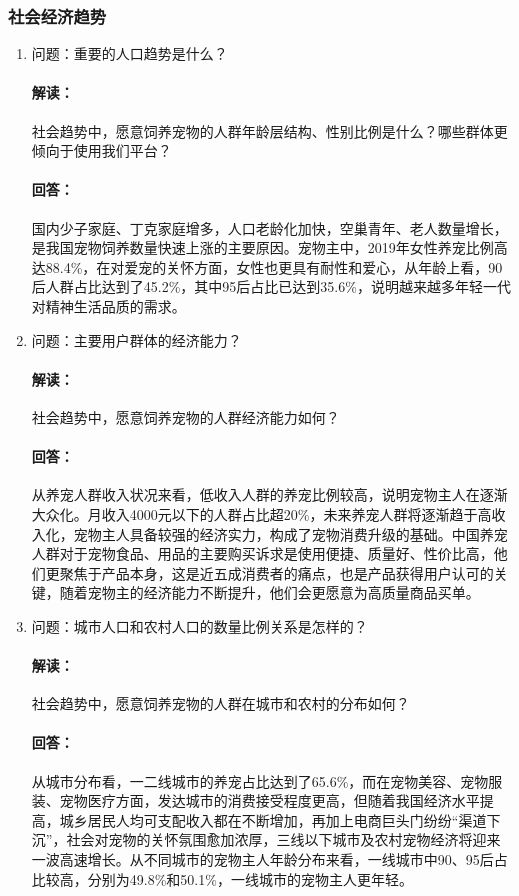 \documentclass[a4paper]{ctexart}
\begin{document}
\subsubsection{社会经济趋势}
\begin{enumerate}[label=\alph*.]
  \item 问题：重要的人口趋势是什么？
  \paragraph{解读：}社会趋势中，愿意饲养宠物的人群年龄层结构、性别比例是什么？哪些群体更倾向于使用我们平台？
  \paragraph{回答：}国内少子家庭、丁克家庭增多，人口老龄化加快，空巢青年、老人数量增长，是我国宠物饲养数量快速上涨的主要原因。宠物主中，2019年女性养宠比例高达88.4\%，在对爱宠的关怀方面，女性也更具有耐性和爱心，从年龄上看，90后人群占比达到了45.2\%，其中95后占比已达到35.6\%，说明越来越多年轻一代对精神生活品质的需求。
  \item 问题：主要用户群体的经济能力？
  \paragraph{解读：}社会趋势中，愿意饲养宠物的人群经济能力如何？
  \paragraph{回答：}从养宠人群收入状况来看，低收入人群的养宠比例较高，说明宠物主人在逐渐大众化。月收入4000元以下的人群占比超20\%，未来养宠人群将逐渐趋于高收入化，宠物主人具备较强的经济实力，构成了宠物消费升级的基础。中国养宠人群对于宠物食品、用品的主要购买诉求是使用便捷、质量好、性价比高，他们更聚焦于产品本身，这是近五成消费者的痛点，也是产品获得用户认可的关键，随着宠物主的经济能力不断提升，他们会更愿意为高质量商品买单。
  \item 问题：城市人口和农村人口的数量比例关系是怎样的？
  \paragraph{解读：}社会趋势中，愿意饲养宠物的人群在城市和农村的分布如何？
  \paragraph{回答：}从城市分布看，一二线城市的养宠占比达到了65.6\%，而在宠物美容、宠物服装、宠物医疗方面，发达城市的消费接受程度更高，但随着我国经济水平提高，城乡居民人均可支配收入都在不断增加，再加上电商巨头门纷纷“渠道下沉”，社会对宠物的关怀氛围愈加浓厚，三线以下城市及农村宠物经济将迎来一波高速增长。从不同城市的宠物主人年龄分布来看，一线城市中90、95后占比较高，分别为49.8\%和50.1\%，一线城市的宠物主人更年轻。

\end{enumerate}
\end{document}
